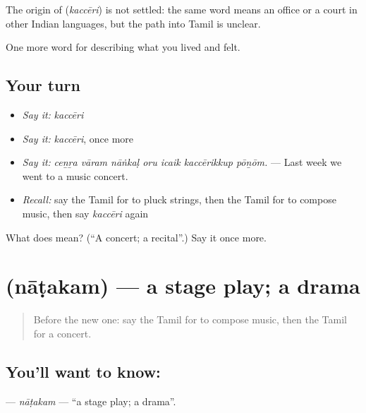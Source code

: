 \begin{cousinweb}
The origin of \textbf{} (\emph{kaccēri}) is not settled: the same word means an office or a court in other Indian languages, but the path into Tamil is unclear.
\end{cousinweb}

\begin{grammarlens}[title={What you've built}]
One more word for describing what you lived and felt.
\end{grammarlens}

\subsection*{Your turn}
\begin{itemize}
\raggedright
  \item \emph{Say it:} \emph{kaccēri}
  \item \emph{Say it:} \emph{kaccēri}, once more
  \item \emph{Say it:} \emph{ceṉṟa vāram nāṅkaḷ oru icaik kaccērikkup pōṉōm.} — Last week we went to a music concert.
  \item \emph{Recall:} say the Tamil for to pluck strings, then the Tamil for to compose music, then say \emph{kaccēri} again
\end{itemize}

\begin{tcolorbox}[breakable,colback=teal!4,colframe=teal!35!black,title={Before you move on}]
What does  mean? (\textquotedblleft{}A concert; a recital\textquotedblright{}.) Say it once more.
\end{tcolorbox}
\section[\texorpdfstring{\ta{நாடகம்} (nāṭakam)}{நாடகம் (nāṭakam)}]{ (nāṭakam) — a stage play; a drama}

\label{lesson:TA-C540-natakam}



\begin{quote}
Before the new one: say the Tamil for to compose music, then the Tamil for a concert.
\end{quote}

\subsection*{You'll want to know: }
\textbf{} — \emph{nāṭakam} — \textquotedblleft{}a stage play; a drama\textquotedblright{}.

